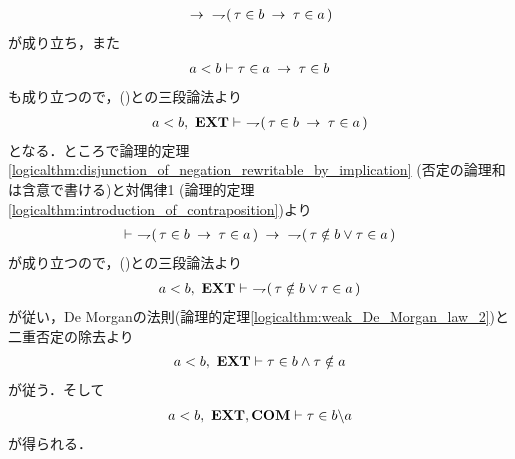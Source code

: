 \begin{prf}
\begin{description}
\begin{align}
					\hspace{0.25em}\rightarrow\hspace{0.25em}\ \rightharpoondown\hspace{-0.25em} (\, \tau \in b \hspace{0.25em}\rightarrow\hspace{0.25em} \tau \in a\, )
					\label{fom:element_and_proper_subset_correspond_6}
				\end{align}
				が成り立ち，また
				\begin{align}
					a < b \vdash \tau \in a \hspace{0.25em}\rightarrow\hspace{0.25em} \tau \in b
				\end{align}
				も成り立つので，()との三段論法より
				\begin{align}
					a < b,\ \mbox{{\bf EXT}} \vdash\ \rightharpoondown\hspace{-0.25em} (\, \tau \in b \hspace{0.25em}\rightarrow\hspace{0.25em} \tau \in a\, )
					\label{fom:element_and_proper_subset_correspond_7}
				\end{align}
				となる．ところで論理的定理\ref{logicalthm:disjunction_of_negation_rewritable_by_implication}
				(否定の論理和は含意で書ける)と対偶律1 (論理的定理\ref{logicalthm:introduction_of_contraposition})より
				\begin{align}
					\vdash\ \negation (\, \tau \in b \rarrow \tau \in a\, ) \rarrow\ 
					\negation (\, \tau \notin b \vee \tau \in a\, )
				\end{align}
				が成り立つので，()との三段論法より
				\begin{align}
					a < b,\ \mbox{{\bf EXT}} \vdash\ \rightharpoondown\hspace{-0.25em} (\, \tau \notin b \vee \tau \in a\, )
				\end{align}
				が従い，De Morganの法則(論理的定理\ref{logicalthm:weak_De_Morgan_law_2})と二重否定の除去より
				\begin{align}
					a < b,\ \mbox{{\bf EXT}} \vdash \tau \in b \wedge \tau \notin a
				\end{align}
				が従う．そして
				\begin{align}
					a < b,\ \mbox{{\bf EXT}},\mbox{\bf COM} \vdash \tau \in b \backslash a
					\label{fom:element_and_proper_subset_correspond_5}
				\end{align}
				が得られる．
				

\end{description}
\end{prf}
